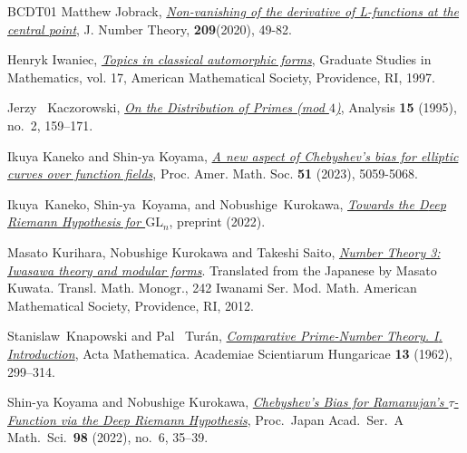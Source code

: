 \documentclass[12pt,reqno]{amsart}
\theoremstyle{definition}
\numberwithin{equation}{section}
\begin{document}
\begin{thebibliography}{BCDT01}
Matthew Jobrack,
\href{https://www.sciencedirect.com/science/article/pii/S0022314X19302963}{\emph{Non-vanishing of the derivative of L-functions at the central point}},
J. Number Theory,
\textbf{209}(2020), 49-82.   

Henryk Iwaniec, \href{https://bookstore.ams.org/gsm-17}{\emph{Topics in classical automorphic forms}}, Graduate Studies in Mathematics, vol. 17, American Mathematical Society, Providence, RI, 1997. 

Jerzy ~Kaczorowski, \emph{\href{https://doi.org/10.1524/anly.1995.15.2.159}{On the Distribution
  of Primes (mod {$4$})}}, Analysis \textbf{15} (1995), no.~2, 159--171.


Ikuya Kaneko and Shin-ya Koyama, 
\href{https://doi.org/10.1090/proc/16461}{\emph{A new aspect of Chebyshev’s bias for elliptic curves over function fields}},  Proc. Amer. Math. Soc. \textbf{51} (2023), 5059-5068.

Ikuya~Kaneko, Shin-ya~Koyama, and Nobushige~Kurokawa, \href{https://arxiv.org/abs/2206.02612}
{\emph{Towards the {D}eep {R}iemann {H}ypothesis for {$\mathrm{GL}_{n}$}}},
preprint (2022).



 Masato Kurihara, Nobushige Kurokawa and Takeshi Saito, \href{https://bookstore.ams.org/view?ProductCode=MMONO/242}{\emph{Number Theory 3: Iwasawa theory and modular forms}}.  Translated from the Japanese by Masato Kuwata. Transl. Math. Monogr., 242
Iwanami Ser. Mod. Math.
American Mathematical Society, Providence, RI, 2012. 
 


Stanislaw~Knapowski and Pal ~Tur\'{a}n,
\emph{\href{https://doi.org/10.1007/BF02020796}{Comparative Prime-Number
  Theory. {I}. {I}ntroduction}}, Acta Mathematica. Academiae Scientiarum
  Hungaricae \textbf{13} (1962), 299--314. 



 Shin-ya Koyama and Nobushige Kurokawa, \emph{\href{https://doi.org/10.3792/pjaa.98.007}{Chebyshev's Bias for
  {R}amanujan's {$\tau$}-Function via the Deep {R}iemann Hypothesis}},
Proc.\ Japan Acad.\ Ser.\ A Math.\ Sci.\ {\bf 98} (2022), no.\ 6, 35--39. 




\end{thebibliography}
\end{document}
